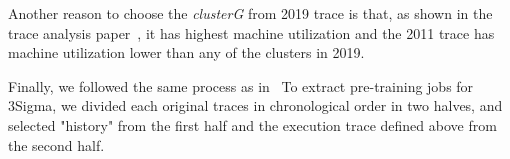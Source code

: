   Another reason to choose the
  \textit{clusterG} from 2019 trace is that, as shown in the trace
  analysis paper~\cite{borgTraceAnalysis2019}, it has highest machine
  utilization and the 2011 trace has machine utilization lower than
  any of the clusters in 2019.
  \fi



Finally, we followed the same process as in~\cite{3Sigma}
To extract pre-training jobs for 3Sigma,
we divided each original traces in chronological
order in two halves, and selected "history" from the first
half and the execution trace defined above from the second half.


